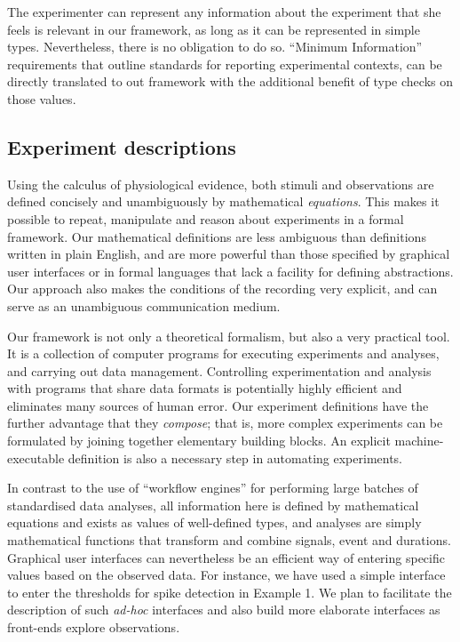 The experimenter can represent any information about the experiment
that she feels is relevant in our framework, as long as it can be
represented in simple types. Nevertheless, there is no obligation to
do so. ``Minimum Information'' requirements
\citep{Taylor2007,Gibson2008} that outline standards for reporting
experimental contexts, can be directly translated to out framework
with the additional benefit of type checks on those values.

\subsection*{Experiment descriptions}

Using the calculus of physiological evidence, both stimuli and
observations are defined concisely and unambiguously by mathematical
\emph{equations}. This makes it possible to repeat, manipulate and
reason about experiments in a formal framework. Our mathematical
definitions are less ambiguous than definitions written in plain
English, and are more powerful than those specified by graphical user
interfaces or in formal languages that lack a facility for defining
abstractions. Our approach also makes the conditions of the recording very
explicit, and can serve as an unambiguous communication medium.

Our framework is not only a theoretical formalism, but also a very
practical tool. It is a collection of computer programs for executing
experiments and analyses, and carrying out data
management. Controlling experimentation and analysis with programs
that share data formats is potentially highly efficient and eliminates
many sources of human error. Our experiment definitions have the
further advantage that they \emph{compose}; that is, more complex
experiments can be formulated by joining together elementary building
blocks. An explicit machine-executable definition is also a necessary
step in automating experiments.

In contrast to the use of ``workflow engines'' for performing large
batches of standardised data analyses, all information here is defined
by mathematical equations and exists as values of well-defined types,
and analyses are simply mathematical functions that transform and
combine signals, event and durations. Graphical user interfaces can
nevertheless be an efficient way of entering specific values based on
the observed data. For instance, we have used a simple interface to
enter the thresholds for spike detection in Example 1. We plan to
facilitate the description of such \emph{ad-hoc} interfaces and also
build more elaborate interfaces as front-ends explore observations.

